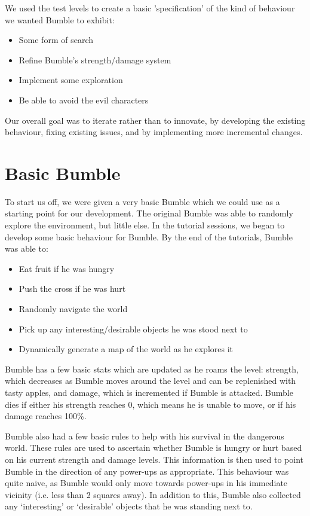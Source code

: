 \documentclass[a4paper,oneside]{report}
\begin{document}
We used the test levels to create a basic 'specification' of the kind of behaviour we wanted Bumble to exhibit:

\begin{itemize}
	\item Some form of search
	\item Refine Bumble's strength/damage system
	\item Implement some exploration
	\item Be able to avoid the evil characters
\end{itemize}

Our overall goal was to iterate rather than to innovate, by developing the existing behaviour, fixing existing issues, and by implementing more incremental changes.

\section{Basic Bumble}

To start us off, we were given a very basic Bumble which we could use as a starting point for our development. The original Bumble was able to randomly explore the environment, but little else. In the tutorial sessions, we began to develop some basic behaviour for Bumble. By the end of the tutorials, Bumble was able to:

\begin{itemize}
	\item Eat fruit if he was hungry
	\item Push the cross if he was hurt
	\item Randomly navigate the world
	\item Pick up any interesting/desirable objects he was stood next to
	\item Dynamically generate a map of the world as he explores it
\end{itemize}

Bumble has a few basic stats which are updated as he roams the level: strength, which decreases as Bumble moves around the level and can be replenished with tasty apples, and damage, which is incremented if Bumble is attacked. Bumble dies if either his strength reaches 0, which means he is unable to move, or if his damage reaches 100\%.

Bumble also had a few basic rules to help with his survival in the dangerous world. These rules are used to ascertain whether Bumble is hungry or hurt based on his current strength and damage levels. This information is then used to point Bumble in the direction of any power-ups as appropriate. This behaviour was quite naive, as Bumble would only move towards power-ups in his immediate vicinity (i.e. less than 2 squares away). In addition to this, Bumble also collected any `interesting' or `desirable' objects that he was standing next to.
\end{document}
